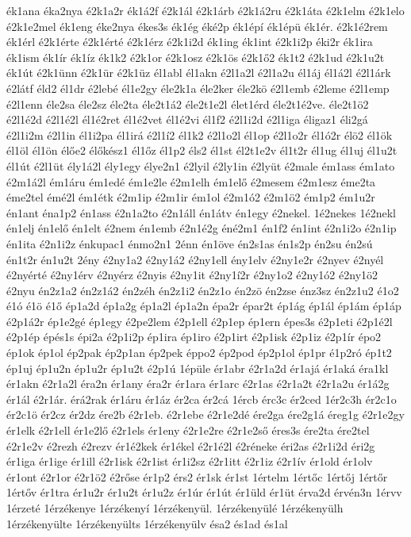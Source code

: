 {ék1ana
éka2nya
é2k1a2r
ék1á2f
é2k1ál
é2k1árb
é2k1á2ru
é2k1áta
é2k1elm
é2k1elo
é2k1e2mel
ék1eng
éke2nya
ékes3s
ék1ég
éké2p
ék1épí
ék1épü
ék1ér.
é2k1é2rem
ék1érl
é2k1érte
é2k1érté
é2k1érz
é2k1i2d
ék1ing
ék1int
é2k1i2p
éki2r
ék1ira
ék1ism
ék1ír
ék1íz
ék1k2
é2k1or
é2k1osz
é2k1ös
é2k1ő2
ék1t2
é2k1ud
é2k1u2t
ék1út
é2k1ünn
é2k1ür
é2k1üz
él1abl
él1akn
é2l1a2l
é2l1a2u
él1áj
él1á2l
é2l1árk
é2látf
éld2
él1dr
é2lebé
él1e2gy
éle2k1a
éle2ker
éle2kö
é2l1emb
é2leme
é2l1emp
é2l1enn
éle2sa
éle2sz
éle2ta
éle2t1á2
éle2t1e2l
élet1érd
éle2t1é2ve.
éle2t1ö2
é2l1é2d
é2l1é2l
él1é2ret
él1é2vet
él1é2vi
él1f2
é2l1i2d
é2l1iga
éligaz1
éli2gá
é2l1i2m
é2l1in
él1i2pa
él1irá
é2l1í2
él1k2
é2l1o2l
él1op
é2l1o2r
él1ó2r
élö2
él1ök
él1öl
él1ön
élőe2
élőkész1
él1őz
él1p2
éls2
él1st
él2t1e2v
él1t2r
él1ug
él1uj
él1u2t
él1út
é2l1üt
ély1á2l
ély1egy
élye2n1
é2lyil
é2ly1in
é2lyüt
é2male
ém1ass
ém1ato
é2m1á2l
ém1áru
ém1edé
ém1e2le
é2m1elh
ém1elő
é2mesem
é2m1esz
éme2ta
éme2tel
émé2l
ém1étk
é2m1ip
é2m1ir
ém1ol
é2m1ó2
é2m1ö2
ém1p2
ém1u2r
én1ant
éna1p2
én1ass
é2n1a2to
é2n1áll
én1átv
én1egy
é2nekel.
1é2nekes
1é2nekl
én1elj
én1elő
én1elt
é2nem
én1emb
é2n1é2g
éné2m1
én1f2
én1int
é2n1i2o
é2n1ip
én1ita
é2n1i2z
énkupac1
énmo2n1
2énn
én1öve
én2s1as
én1s2p
én2su
én2sú
én1t2r
én1u2t
2ény
é2ny1a2
é2ny1á2
é2ny1ell
ény1elv
é2ny1e2r
é2nyev
é2nyél
é2nyérté
é2ny1érv
é2nyérz
é2nyis
é2ny1it
é2ny1í2r
é2ny1o2
é2ny1ó2
é2ny1ö2
é2nyu
én2z1a2
én2z1á2
én2zéh
én2z1i2
én2z1o
én2zö
én2zse
énz3sz
én2z1u2
é1o2
é1ó
é1ö
é1ő
ép1a2d
ép1a2g
ép1a2l
ép1a2n
épa2r
épar2t
ép1ág
ép1ál
ép1ám
ép1áp
é2p1á2r
ép1e2gé
ép1egy
é2pe2lem
é2p1ell
é2p1ep
ép1ern
épes3s
é2p1eti
é2p1é2l
é2p1ép
épés1s
épi2a
é2p1i2p
ép1ira
ép1iro
é2p1irt
é2p1isk
é2p1iz
é2p1ír
épo2
ép1ok
ép1ol
ép2pak
ép2p1an
ép2pek
éppo2
ép2pod
ép2p1ol
ép1pr
é1p2ró
ép1t2
ép1uj
ép1u2n
ép1u2r
ép1u2t
é2p1ú
1épüle
ér1abr
é2r1a2d
ér1ajá
ér1aká
éra1kl
ér1akn
é2r1a2l
éra2n
ér1any
éra2r
ér1ara
ér1arc
é2r1as
é2r1a2t
é2r1a2u
ér1á2g
ér1ál
é2r1ár.
érá2rak
ér1áru
ér1áz
ér2ca
ér2cá
1ércb
érc3c
ér2ced
1ér2c3h
ér2c1o
ér2c1ö
ér2cz
ér2dz
ére2b
é2r1eb.
é2r1ebe
é2r1e2dé
ére2ga
ére2g1á
éreg1g
é2r1e2gy
ér1elk
é2r1ell
ér1e2lő
é2r1els
ér1eny
é2r1e2re
é2r1e2ső
éres3s
ére2ta
ére2tel
é2r1e2v
é2rezh
é2rezv
ér1é2kek
ér1ékel
é2r1é2l
é2réneke
éri2as
é2r1i2d
éri2g
ér1iga
ér1ige
ér1ill
é2r1isk
é2r1ist
ér1i2sz
é2r1itt
é2r1iz
é2r1ív
ér1old
ér1olv
ér1ont
é2r1or
é2r1ö2
é2rőse
ér1p2
érs2
ér1sk
ér1st
1értelm
1értőc
1értőj
1értőr
1értőv
ér1tra
ér1u2r
ér1u2t
ér1u2z
ér1úr
ér1út
ér1üld
ér1üt
érva2d
érvén3n
1érvv
1érzeté
1érzékenye
1érzékenyí
1érzékenyül.
1érzékenyülé
1érzékenyülh
1érzékenyülte
1érzékenyülts
1érzékenyülv
ésa2
és1ad
és1al
}
